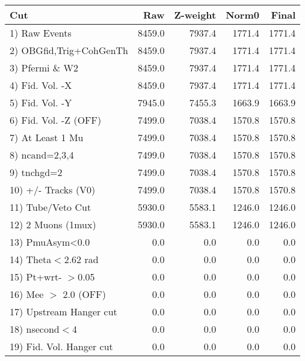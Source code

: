  \begin{table}[h!]\centering
 \begin{tabular}{||l||r|r|r|r||}
 \hline
 \hline
 Cut & Raw & Z-weight & Norm0 & Final \\
 \hline
  1) Raw Events           &      8459.0 &      7937.4 &      1771.4 &      1771.4 \\
  2) OBGfid,Trig+CohGenTh &      8459.0 &      7937.4 &      1771.4 &      1771.4 \\
  3) Pfermi \& W2         &      8459.0 &      7937.4 &      1771.4 &      1771.4 \\
  4) Fid. Vol. -X         &      8459.0 &      7937.4 &      1771.4 &      1771.4 \\
  5) Fid. Vol. -Y         &      7945.0 &      7455.3 &      1663.9 &      1663.9 \\
  6) Fid. Vol. -Z (OFF)   &      7499.0 &      7038.4 &      1570.8 &      1570.8 \\
  7) At Least 1 Mu        &      7499.0 &      7038.4 &      1570.8 &      1570.8 \\
  8) ncand=2,3,4          &      7499.0 &      7038.4 &      1570.8 &      1570.8 \\
  9) tnchgd=2             &      7499.0 &      7038.4 &      1570.8 &      1570.8 \\
 10) +/- Tracks (V0)      &      7499.0 &      7038.4 &      1570.8 &      1570.8 \\
 11) Tube/Veto Cut        &      5930.0 &      5583.1 &      1246.0 &      1246.0 \\
 12) 2 Muons (1mux)       &      5930.0 &      5583.1 &      1246.0 &      1246.0 \\
 13) PmuAsym<0.0          &         0.0 &         0.0 &         0.0 &         0.0 \\
 14) Theta$<$2.62 rad     &         0.0 &         0.0 &         0.0 &         0.0 \\
 15) Pt+wrt- $>$0.05      &         0.0 &         0.0 &         0.0 &         0.0 \\
 16) Mee $>$ 2.0  (OFF)   &         0.0 &         0.0 &         0.0 &         0.0 \\
 17) Upstream Hanger cut  &         0.0 &         0.0 &         0.0 &         0.0 \\
 18) nsecond$<$4          &         0.0 &         0.0 &         0.0 &         0.0 \\
 19) Fid. Vol. Hanger cut &         0.0 &         0.0 &         0.0 &         0.0 \\

\end{tabular}
\end{table}
